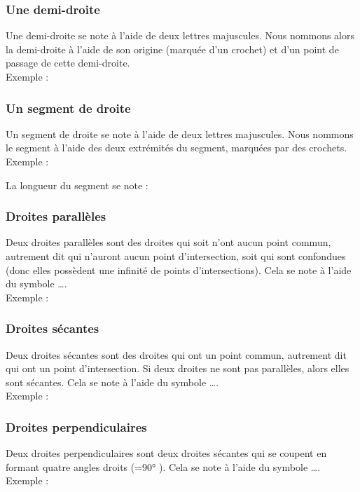 \documentclass[paper=a4, twoside, fontsize=12pt, parskip=half-, numbers=enddot, open=right]{scrbook}
\begin{document}
\subsubsection{Une demi-droite}
Une demi-droite se note à l'aide de deux lettres majuscules. Nous nommons alors la demi-droite à l'aide de son origine (marquée d'un crochet) et d'un point de passage de cette demi-droite. \\
Exemple :
\vspace{2cm}

\subsubsection{Un segment de droite}
Un segment de droite se note à l'aide de deux lettres majuscules. Nous nommons le segment à l'aide des deux extrémités du segment, marquées par des crochets. \\
Exemple :
\vspace{2cm}

La longueur du segment se note :

\subsubsection{Droites parallèles}
Deux droites parallèles sont des droites qui soit n'ont aucun point commun, autrement dit qui n'auront aucun point d'intersection, soit qui sont confondues (donc elles possèdent une infinité de points d'intersections). Cela se note à l'aide du symbole \ldots .\\
Exemple :
\vspace{2cm}

\subsubsection{Droites sécantes}
Deux droites sécantes sont des droites qui ont un point commun, autrement dit qui ont un point d'intersection. Si deux droites ne sont pas parallèles, alors elles sont sécantes. Cela se note à l'aide du symbole \ldots .\\
Exemple :
\vspace{2cm}

\subsubsection{Droites perpendiculaires}
Deux droites perpendiculaires sont deux droites sécantes qui se coupent en formant quatre angles droits (=90° ). Cela se note à l'aide du symbole \ldots . \\
Exemple :
\vspace{2cm}
\end{document}
